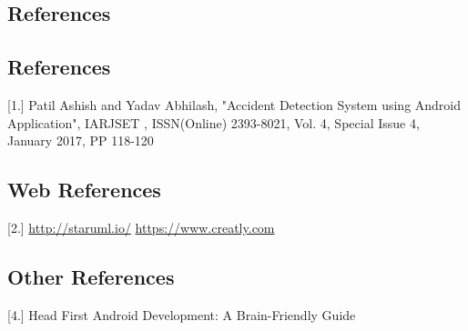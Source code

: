 \documentclass{article}
\begin{document}
\begin{flushleft}
    \newpage
    
    \section{References}
    \subsection{References}
    [1.] Patil Ashish and Yadav Abhilash, "Accident Detection System using Android Application", IARJSET , ISSN(Online) 2393-8021, Vol. 4, Special Issue 4, January 2017, PP 118-120 

    
    \subsection{Web References}
    
        [2.] \url{http://staruml.io/}  \newline
        [3.] \url{https://www.creatly.com}
    
    \subsection{Other References}
    
    [4.] Head First Android Development: A Brain-Friendly Guide  
    \newpage
            
    
\end{flushleft}
\end{document}

